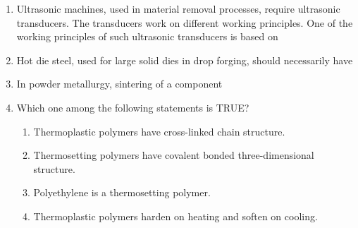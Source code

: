 \documentclass[journal,12pt,onecolumn]{IEEEtran}
\theoremstyle{remark}
\begin{document}
\begin{enumerate}
\item Ultrasonic machines, used in material removal processes, require ultrasonic transducers. The transducers work on different working principles. One of the working principles of such ultrasonic transducers is based on
\hfill{}
\begin{enumerate}
\end{enumerate}

\item Hot die steel, used for large solid dies in drop forging, should necessarily have
\hfill{}
\begin{enumerate}
\end{enumerate}

\item In powder metallurgy, sintering of a component
\hfill{}
\begin{enumerate}
\end{enumerate}

\item Which one among the following statements is TRUE?
\hfill{}
\begin{enumerate}
\item Thermoplastic polymers have cross-linked chain structure.
\item Thermosetting polymers have covalent bonded three-dimensional structure.
\item Polyethylene is a thermosetting polymer.
\item Thermoplastic polymers harden on heating and soften on cooling.
\end{enumerate}


\end{enumerate}
\end{document}
